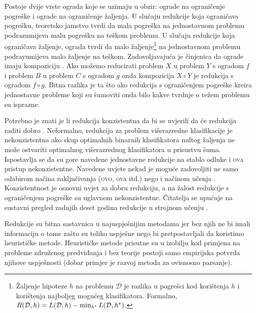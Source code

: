 Postoje dvije vrste ograda koje se uzimaju u obzir: ograde na ograničenje
pogreške i ograde na ograničenje žaljenja. U slučaju redukcije koja ograničava
pogrešku, teoretsko jamstvo tvrdi da mala pogreška na jednostavnom problemu
podrazumijeva malu pogrešku na teškom problemu. U slučaju redukcije koja
ograničava žaljenje, ograda tvrdi da malo žaljenje\footnote{Žaljenje hipoteze
$h$ na problemu $\mathcal{D}$ je razlika u pogrešci kod korištenja $h$ i
korištenja najboljeg mogućeg klasifikatora. Formalno, $R(\mathcal{D}, h) =
L(\mathcal{D}, h) - \min_{h\ssymbol{1}} L(\mathcal{D}, h\ssymbol{1})$.} na
jednostavnom problemu podrayumijeva malo žaljenje na teškom. Zadovoljavajuća je
činjenica da ograde imaju kompoziciju \cite{beygelzimer2005error}. Ako možemo
reducirati problem $X$ u problem $Y$ s ogradom $f$ i problem $B$ u problem $C$ s
ogradom $g$ onda kompozicija $X \circ Y$ je redukcija s ogradom $f \circ g$.
Bitna razlika je ta što ako redukcija s ograničenjem pogreške kreira jednostavne
probleme koji su šumoviti onda bilo kakve tvrdnje o težem problemu su isprazne.

Potrebno je znati je li redukcija konzistentna  da bi se
uvjerili da će redukcija raditi dobro \citep{beygelzimer2009error,
daume15reductions}. Neformalno, redukcija za problem višerazredne klasifikacije
je nekonzistentna ako skup optimalnih binarnih klasifikatora nultog žaljenja
 ne može ostvariti optimalnog
višerazrednog klasifikatora u prisustvu šuma. Ispostavlja se da su gore navedene
jednostavne redukcije na stablo odluke i \textsc{ova} pristup nekonzistentne.
Navedene uvjete nekad je moguće zadovoljiti ne samo odabirom načina
zaključivanja (\textsc{ovo}, \textsc{ova} itd.) nego i načinom učenja
\citep{abe2004iterative, beygelzimer2005weighted}. Konzistentnost je osnovni
uvjet za dobru redukciju, a na žalost redukcije s ograničenjem pogreške su
uglavnom nekonzistentne. Čitatelja se upućuje na sustavni pregled zadnjih deset
godina redukcije u strojnom učenju \citep{daume15reductions}.

Redukcije su bitna sastavnica u najuspješnijim \lts{} metodama jer bez njih ne
bi imali informaciju o tome zašto su toliko uspješne nego bi pretpostavljali da
koristimo heurističke metode. Heurističke metode prisutne su u izobilju kod
primjena na probleme združenog predviđanja i bez teorije postoji samo empirijska
potvrda njihove uspješnosti (dobar primjer je razvoj metoda za ovisnosno
parsanje).
